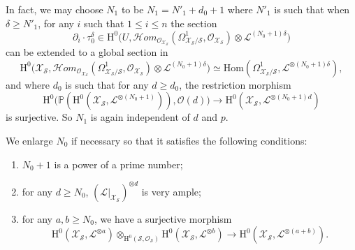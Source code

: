 \documentclass[11pt]{article}
\numberwithin{equation}{section}
\newcommand{\cHom}{\mathcal{H}\!om}
\theoremstyle{plain}
\theoremstyle{definition}
\newcommand{\ho}{\mathrm{H}}
\newcommand{\Hom}{\mathrm{Hom}}
\newcommand{\X}{\mathcal{X}}
\newcommand{\li}{\mathcal{L}}
\newcommand{\pr}{\mathbb{P}}
\begin{document}
In fact, we may choose $N_1$ to be $N_1\!=\!N'_1+d_0+1$ where $N'_1$ is such that when \hbox{$\delta\!\geq\!N'_1$}, for any $i$ such that $1\leq i\leq n$ the section\vspace*{-3pt}
\[
\partial_i\cdot \tau_0^{\delta}\in \ho^0\bigl(U, \cHom_{\mathcal{O}_{\X_\mathcal{S}}}(\Omega^1_{\X_\mathcal{S}/\mathcal{S}}, \mathcal{O}_{\X_\mathcal{S}})\otimes \li^{(N_0+1)\delta} \bigr)
\]
can be extended to a global section in\vspace*{-3pt}
\[
\ho^0\bigl(\X_\mathcal{S}, \cHom_{\mathcal{O}_{\X_\mathcal{S}}}(\Omega^1_{\X_\mathcal{S}/\mathcal{S}}, \mathcal{O}_{\X_\mathcal{S}})\otimes \li^{(N_0+1)\delta} \bigr)\simeq \Hom(\Omega^1_{\X_\mathcal{S}/\mathcal{S}}, \li^{\otimes(N_0+1)\delta}),
\]
and where $d_0$ is such that for any $d\geq d_0$, the restriction morphism
\[
\ho^0\bigl(\pr(\ho^0(\X_{\mathcal{S}}, \li^{\otimes (N_0+1)})),\mathcal{O}(d)\bigr) \to \ho^0(\X_{\mathcal{S}}, \li^{\otimes (N_0+1)d})
\]
is surjective. So $N_1$ is again independent of $d$ and $p$.

We enlarge $N_0$ if necessary so that it satisfies the following conditions:
\begin{enumerate}
\item $N_0+1$ is a power of a prime number;
\item for any $d\geq N_0$, $(\li |_{\X_\mathcal{S}})^{\otimes d}$ is very ample;
\item for any $a,b\geq N_0$, we have a surjective morphism
\[
\ho^0(\X_{\mathcal{S}}, \li^{\otimes a}) \otimes_{\ho^0(\mathcal{S}, \mathcal{O}_{\mathcal{S}})}\ho^0(\X_{\mathcal{S}}, \li^{\otimes b})\to \ho^0(\X_{\mathcal{S}}, \li^{\otimes (a+b)}).
\]
\end{enumerate}
\end{document}

